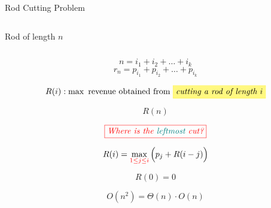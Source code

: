 
\begin{frame}{}
  \centerline{\LARGE {}}

  \vspace{0.50cm}
\end{frame}

\begin{frame}{}
  \begin{exampleblock}{Rod Cutting Problem}
    \begin{columns}
	\begin{center}
	  {\large Rod of length $n$}

	\end{center}
	\begin{table}[]
	  \centering
	\end{table}
    \end{columns}

    \vspace{0.60cm}
    \[
      n = i_1 + i_2 + \dots + i_k
    \]
    \[
      r_n = p_{i_1} + p_{i_2} + \dots + p_{i_k}
    \]
  \end{exampleblock}
\end{frame}

\begin{frame}{}
  \[
    R(i): \max \text{ revenue obtained from \hl{yellow}{\it cutting a rod of length $i$}}
  \]

  \[
    R(n)
  \]

  \pause
  \[
    \textcolor{red}{\fbox{\it Where is the {\textcolor{teal}{leftmost}} cut?}}
  \]

  \pause
  \[
    R(i) = \max_{\textcolor{red}{1 \le j \le i}} \Big(p_j + R(i-j)\Big)
  \]

  \pause
  \[
    R(0) = 0
  \]

  \pause
  \[
    O(n^2) = \Theta(n) \cdot O(n)
  \]
\end{frame}


